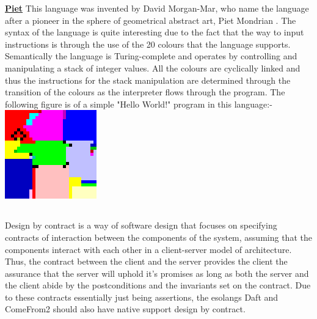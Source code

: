 \documentclass{article}
\begin{document}
\linebreak{}
\linebreak{}

\underline{\textbf{Piet}}
\linebreak{}
This language was invented by David Morgan-Mar, who name the language after a pioneer in the sphere of geometrical abstract art, Piet Mondrian \cite{web:piet:def}. The syntax of the language is quite interesting due to the fact that the way to input instructions is through the use of the 20 colours that the language supports. Semantically the language is Turing-complete and operates by controlling and manipulating a stack of integer values. All the colours are cyclically linked and thus the instructions for the stack manipulation are determined through the transition of the colours as the interpreter flows through the program. The following figure is of a simple "Hello World!" program in this language:-
\linebreak{}
\includegraphics{Piet_hello_big.png}

\linebreak{}
\linebreak{}

\subsection{}
Design by contract is a way of software design that focuses on specifying contracts of interaction between the components of the system, assuming that the components interact with each other in a client-server model of architecture. Thus, the contract between the client and the server provides the client the assurance that the server will uphold it's promises as long as both the server and the client abide by the postconditions and the invariants set on the contract. Due to these contracts essentially just being assertions, the esolangs Daft and ComeFrom2 should also have native support design by contract.

\pagebreak



\end{document}
